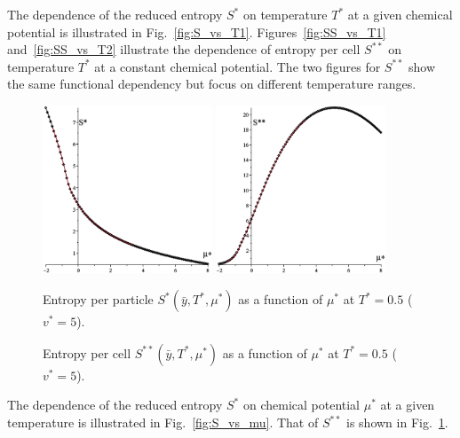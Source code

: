 \documentclass[12pt]{article}
\numberwithin{equation}{section}
\begin{document}
	The dependence of the reduced entropy $S^*$ on temperature $T^*$ at a given chemical potential is illustrated in Fig.~\ref{fig:S_vs_T1}. Figures~\ref{fig:SS_vs_T1} and~\ref{fig:SS_vs_T2} illustrate the dependence of entropy per cell $S^{**}$ on temperature $T^*$ at a constant chemical potential. The two figures for $S^{**}$ show the same functional dependency but focus on different temperature ranges.
	
	\begin{figure}[htbp]
		\includegraphics[width=0.45\textwidth,angle=0]{S_vs_mu}
		\hfill
		\includegraphics[width=0.45\textwidth,angle=0]{SS_vs_mu}
		\\
		\parbox{0.45\textwidth}{\caption{\label{fig:S_vs_mu} Entropy per particle $S^{*}(\bar{y},T^*,\mu^*)$ as a function of $\mu^*$ at $T^*=0.5$ ($v^* = 5$).}}
		\hfill
		\parbox{0.45\textwidth}{\caption{\label{fig:SS_vs_mu} Entropy per cell $S^{**}(\bar{y},T^*,\mu^*)$ as a function of $\mu^*$ at $T^*=0.5$ ($v^* = 5$).}}
	\end{figure}
	
	The dependence of the reduced entropy $S^*$ on chemical potential $\mu^*$ at a given temperature is illustrated in Fig.~\ref{fig:S_vs_mu}. That of $S^{**}$ is shown in Fig.~\ref{fig:SS_vs_mu}.
	
\end{document}
